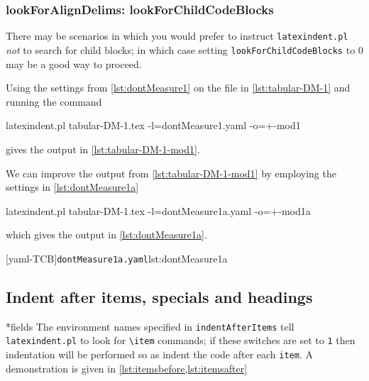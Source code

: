 \subsubsection{lookForAlignDelims: lookForChildCodeBlocks}\label{sec:lookForChildCodeBlocks}
 There  may be scenarios in
 which you would prefer to instruct \texttt{latexindent.pl} \emph{not} to search for child
 blocks; in which case setting \texttt{lookForChildCodeBlocks} to 0 may be a good way to
 proceed.

 \begin{example}
 Using the settings from \vref{lst:dontMeasure1} on the file in \cref{lst:tabular-DM-1}
 and running the command

 \begin{commandshell}
latexindent.pl tabular-DM-1.tex -l=dontMeasure1.yaml -o=+-mod1
\end{commandshell}

 gives the output in \cref{lst:tabular-DM-1-mod1}.
 \begin{cmhtcbraster}
 \end{cmhtcbraster}

 We can improve the output from \cref{lst:tabular-DM-1-mod1} by employing the settings in
 \cref{lst:dontMeasure1a}

 \begin{commandshell}
latexindent.pl tabular-DM-1.tex -l=dontMeasure1a.yaml -o=+-mod1a
\end{commandshell}

 which gives the output in \cref{lst:dontMeasure1a}.

 \begin{cmhtcbraster}
  [yaml-TCB]{\texttt{dontMeasure1a.yaml}}{lst:dontMeasure1a}
 \end{cmhtcbraster}
 \end{example}

\subsection{Indent after items, specials and headings}
*{fields}
 The environment names specified in \texttt{indentAfterItems} tell \texttt{latexindent.pl}
 to look for \lstinline!\item! commands; if these switches are set to \texttt{1} then
 indentation will be performed so as indent the code after each \texttt{item}. A
 demonstration is given in \cref{lst:itemsbefore,lst:itemsafter}

